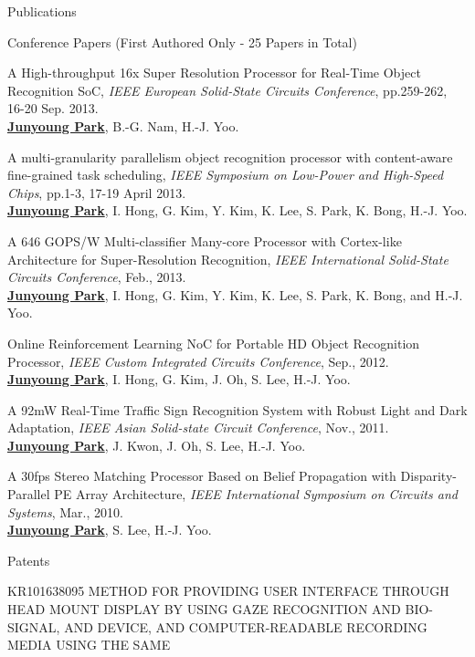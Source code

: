 \documentclass{resume} %
\begin{document}
\begin{section}{Publications}
\begin{subsection}{Conference Papers (First Authored Only - 25 Papers in Total)}{}{}{}
\item A High-throughput 16x Super Resolution Processor for Real-Time Object Recognition SoC, \emph{IEEE European Solid-State Circuits Conference}, pp.259-262, 16-20 Sep. 2013. \\
{\small \underline{\bf Junyoung Park}, B.-G. Nam, H.-J. Yoo.}

\item A multi-granularity parallelism object recognition processor with content-aware fine-grained task scheduling, \emph{IEEE Symposium on Low-Power and High-Speed Chips}, pp.1-3, 17-19 April 2013. \\
{\small \underline{\bf Junyoung Park}, I. Hong, G. Kim, Y. Kim, K. Lee, S. Park, K. Bong, H.-J. Yoo.}

\item A 646 GOPS/W Multi-classifier Many-core Processor with Cortex-like Architecture for Super-Resolution Recognition, \emph{IEEE International Solid-State Circuits Conference}, Feb., 2013. \\
{\small \underline{\bf Junyoung Park}, I. Hong, G. Kim, Y. Kim, K. Lee, S. Park, K. Bong, and H.-J. Yoo.}

\item Online Reinforcement Learning NoC for Portable HD Object Recognition Processor, \emph{IEEE Custom Integrated Circuits Conference}, Sep., 2012. \\
{\small \underline{\bf Junyoung Park}, I. Hong, G. Kim, J. Oh, S. Lee, H.-J. Yoo.}

\item A 92mW Real-Time Traffic Sign Recognition System with Robust Light and Dark Adaptation, \emph{IEEE Asian Solid-state Circuit Conference}, Nov., 2011. \\
{\small \underline{\bf Junyoung Park}, J. Kwon, J. Oh, S. Lee, H.-J. Yoo.}

\item A 30fps Stereo Matching Processor Based on Belief Propagation with Disparity-Parallel PE Array Architecture, \emph{IEEE International Symposium on Circuits and Systems}, Mar., 2010. \\
{\small \underline{\bf Junyoung Park}, S. Lee, H.-J. Yoo.}

\end{subsection}

\begin{subsection}{Patents}{}{}{}

\item {\small KR101638095 METHOD FOR PROVIDING USER INTERFACE THROUGH HEAD MOUNT DISPLAY BY USING GAZE RECOGNITION AND BIO-SIGNAL, AND DEVICE, AND COMPUTER-READABLE RECORDING MEDIA USING THE SAME}


\end{subsection}
\end{section}
\end{document}
